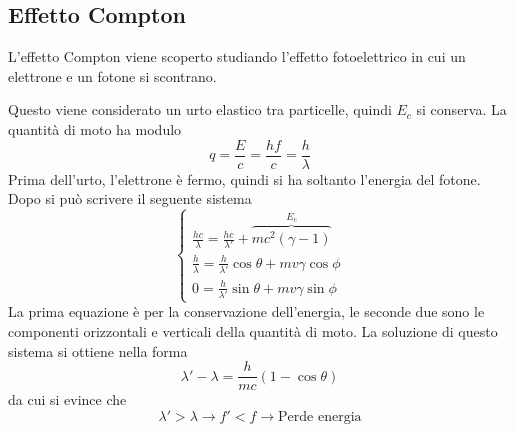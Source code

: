 \subsection{Effetto Compton}
L'effetto Compton viene scoperto studiando l'effetto fotoelettrico in cui un elettrone e un fotone
si scontrano.
\begin{center}
\end{center}
Questo viene considerato un urto elastico tra particelle, quindi $E_c$ si conserva. La quantità di 
moto ha modulo
\begin{equation*}
  q = \frac{E}{c}= \frac{hf}{c} = \frac{h}{\lambda}
\end{equation*}
Prima dell'urto, l'elettrone è fermo, quindi si ha soltanto l'energia del fotone. Dopo si può 
scrivere il seguente sistema
\begin{equation*}
  \begin{cases}
    \frac{hc}{\lambda}=\frac{hc}{\lambda'} + \overbrace{mc^2(\gamma-1)}^{E_c}\\
    \frac{h}{\lambda}=\frac{h}{\lambda'}\cos\theta+mv\gamma\cos\phi\\
    0=\frac{h}{\lambda'}\sin\theta+mv\gamma\sin\phi
  \end{cases}
\end{equation*}
La prima equazione è per la conservazione dell'energia, le seconde due sono le componenti orizzontali
e verticali della quantità di moto. La soluzione di questo sistema si ottiene nella forma
\begin{equation*}
  \lambda'-\lambda=\frac{h}{mc}(1-\cos\theta)
\end{equation*}
da cui si evince che
\begin{equation*}
  \lambda'>\lambda \rightarrow f'<f \rightarrow \text{Perde energia}
\end{equation*}


